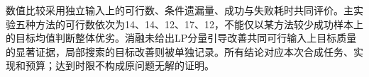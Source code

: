 数值比较采用独立输入上的可行数、条件遗漏量、成功与失败耗时共同评价。主实验五种方法的可行数依次为14、14、12、17、12，不能仅以某方法较少成功样本上的目标均值判断整体优劣。消融未给出LP分量引导改善共同可行输入上目标质量的显著证据，局部搜索的目标改善则被单独记录。所有结论对应本次合成任务、实现和预算；达到时限不构成原问题无解的证明。
